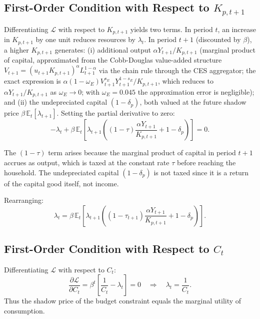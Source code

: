 	\subsection*{First-Order Condition with Respect to $K_{p,t+1}$}
	
	Differentiating $\mathcal{L}$ with respect to $K_{p,t+1}$ yields two terms. In period $t$, an increase in $K_{p,t+1}$ by one unit reduces resources by $\lambda_t$. In period $t+1$ (discounted by $\beta$), a higher $K_{p,t+1}$ generates: (i) additional output $\alpha Y_{t+1}/K_{p,t+1}$ (marginal product of capital, approximated from the Cobb-Douglas value-added structure $V_{t+1} = (u_{t+1}K_{p,t+1})^\alpha L_{t+1}^{1-\alpha}$ via the chain rule through the CES aggregator; the exact expression is $\alpha(1-\omega_E)V_{t+1}^{s_E}Y_{t+1}^{1-s_E}/K_{p,t+1}$, which reduces to $\alpha Y_{t+1}/K_{p,t+1}$ as $\omega_E \to 0$; with $\omega_E = 0.045$ the approximation error is negligible); and (ii) the undepreciated capital $(1-\delta_p)$, both valued at the future shadow price $\beta\,\mathbb{E}_t[\lambda_{t+1}]$. Setting the partial derivative to zero:
	\begin{equation*}
		-\lambda_t + \beta\,\mathbb{E}_t\!\left[\lambda_{t+1}
		\left((1-\tau)\frac{\alpha Y_{t+1}}{K_{p,t+1}} + 1 - \delta_p\right)\right] = 0.
	\end{equation*}
	
	The $(1-\tau)$ term arises because the marginal product of capital in period $t+1$ accrues as output, which is taxed at the constant rate $\tau$ before reaching the household. The undepreciated capital $(1-\delta_p)$ is not taxed since it is a return of the capital good itself, not income.
	
	Rearranging:
	\begin{equation*}
		\lambda_t = \beta\,\mathbb{E}_t\!\left[\lambda_{t+1}
		\left((1-\tau_{t+1})\frac{\alpha Y_{t+1}}{K_{p,t+1}} + 1 - \delta_p\right)\right]
		\tag{A1}\label{eq:foc_k}.
	\end{equation*}
	
	\subsection*{First-Order Condition with Respect to $C_t$}
	
	Differentiating $\mathcal{L}$ with respect to $C_t$:
	\begin{equation*}
		\frac{\partial \mathcal{L}}{\partial C_t} = \beta^t\left[\frac{1}{C_t} - \lambda_t\right] = 0
		\quad \Longrightarrow \quad
		\lambda_t = \frac{1}{C_t}
		\tag{A2}\label{eq:foc_c}.
	\end{equation*}
	Thus the shadow price of the budget constraint equals the marginal utility of consumption.
	
